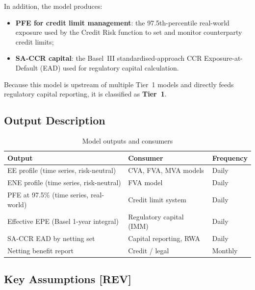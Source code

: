 \documentclass[11pt,a4paper]{article}
\begin{document}
In addition, the model produces:

\begin{itemize}[noitemsep]
  \item \textbf{PFE for credit limit management}: the 97.5th-percentile
        real-world exposure used by the Credit Risk function to set and
        monitor counterparty credit limits;
  \item \textbf{SA-CCR capital}: the Basel~III standardised-approach CCR
        Exposure-at-Default (EAD) used for regulatory capital calculation.
\end{itemize}

Because this model is upstream of multiple Tier~1 models and directly feeds
regulatory capital reporting, it is classified as \textbf{Tier~1}.

\subsection{Output Description}

\begin{table}[h!]
\centering
\begin{tabular}{@{}lll@{}}
\toprule
\textbf{Output} & \textbf{Consumer} & \textbf{Frequency} \\
\midrule
EE profile (time series, risk-neutral) & CVA, FVA, MVA models       & Daily \\
ENE profile (time series, risk-neutral) & FVA model                 & Daily \\
PFE at 97.5\% (time series, real-world) & Credit limit system       & Daily \\
Effective EPE (Basel 1-year integral)   & Regulatory capital (IMM)  & Daily \\
SA-CCR EAD by netting set               & Capital reporting, RWA    & Daily \\
Netting benefit report                  & Credit / legal            & Monthly \\
\bottomrule
\end{tabular}
\caption{Model outputs and consumers}
\end{table}

\subsection{Key Assumptions \textbf{[REV]}}
\end{document}

